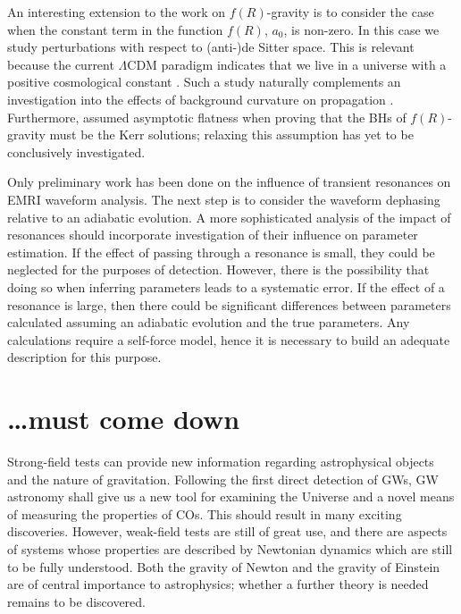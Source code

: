An interesting extension to the work on $f(R)$-gravity is to consider the case when the constant term in the function $f(R)$, $a_0$, is non-zero. In this case we study perturbations with respect to (anti-)de Sitter space. This is relevant because the current $\Lambda$CDM paradigm indicates that we live in a universe with a positive cosmological constant \citep{Komatsu2011,Hinshaw2012,Ade2013b}. Such a study naturally complements an investigation into the effects of background curvature on propagation \citep{Yang2011}. Furthermore, \citet{Sotiriou2011} assumed asymptotic flatness when proving that the BHs of $f(R)$-gravity must be the Kerr solutions; relaxing this assumption has yet to be conclusively investigated.

Only preliminary work has been done on the influence of transient resonances on EMRI waveform analysis. The next step is to consider the waveform dephasing relative to an adiabatic evolution. A more sophisticated analysis of the impact of resonances should incorporate investigation of their influence on parameter estimation. If the effect of passing through a resonance is small, they could be neglected for the purposes of detection. However, there is the possibility that doing so when inferring parameters leads to a systematic error. If the effect of a resonance is large, then there could be significant differences between parameters calculated assuming an adiabatic evolution and the true parameters. Any calculations require a self-force model, hence it is necessary to build an adequate description for this purpose.

\section{\ldots must come down}

Strong-field tests can provide new information regarding astrophysical objects and the nature of gravitation. Following the first direct detection of GWs, GW astronomy shall give us a new tool for examining the Universe and a novel means of measuring the properties of COs. This should result in many exciting discoveries. However, weak-field tests are still of great use, and there are aspects of systems whose properties are described by Newtonian dynamics which are still to be fully understood. Both the gravity of Newton and the gravity of Einstein are of central importance to astrophysics; whether a further theory is needed remains to be discovered.